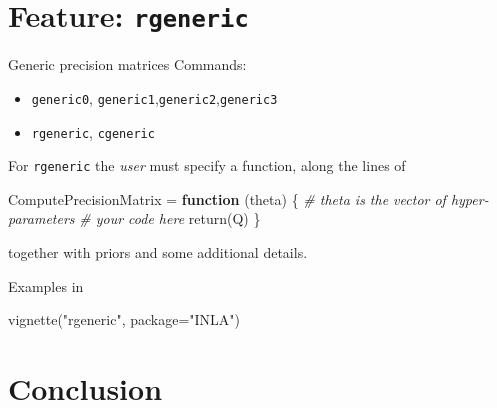 \documentclass[
  ignorenonframetext,
]{beamer}
\newenvironment{Shaded}{\begin{snugshade}}{\end{snugshade}}
\newcommand{\AttributeTok}[1]{\textcolor[rgb]{0.77,0.63,0.00}{#1}}
\newcommand{\CommentTok}[1]{\textcolor[rgb]{0.56,0.35,0.01}{\textit{#1}}}
\newcommand{\ControlFlowTok}[1]{\textcolor[rgb]{0.13,0.29,0.53}{\textbf{#1}}}
\newcommand{\FunctionTok}[1]{\textcolor[rgb]{0.00,0.00,0.00}{#1}}
\newcommand{\NormalTok}[1]{#1}
\newcommand{\OtherTok}[1]{\textcolor[rgb]{0.56,0.35,0.01}{#1}}
\newcommand{\StringTok}[1]{\textcolor[rgb]{0.31,0.60,0.02}{#1}}
\begin{document}
\hypertarget{feature-rgeneric}{%
\section{\texorpdfstring{Feature:
\texttt{rgeneric}}{Feature: rgeneric}}\label{feature-rgeneric}}

\begin{frame}[fragile]{Generic precision matrices}
\protect\hypertarget{generic-precision-matrices}{}
Commands:

\begin{itemize}
\item
  \texttt{generic0},
  \texttt{generic1},\texttt{generic2},\texttt{generic3}
\item
  \texttt{rgeneric}, \texttt{cgeneric}
\end{itemize}

For \texttt{rgeneric} the \emph{user} must specify a function, along the
lines of

\begin{Shaded}
\begin{Highlighting}[]
\NormalTok{ComputePrecisionMatrix }\OtherTok{=} \ControlFlowTok{function}\NormalTok{ (theta) \{}
  \CommentTok{\# theta is the vector of hyper{-}parameters}
  \CommentTok{\# your code here}
  \FunctionTok{return}\NormalTok{(Q)}
\NormalTok{\}}
\end{Highlighting}
\end{Shaded}

together with priors and some additional details.

Examples in

\begin{Shaded}
\begin{Highlighting}[]
\FunctionTok{vignette}\NormalTok{(}\StringTok{"rgeneric"}\NormalTok{, }\AttributeTok{package=}\StringTok{"INLA"}\NormalTok{)}
\end{Highlighting}
\end{Shaded}
\end{frame}

\hypertarget{conclusion}{%
\section{Conclusion}\label{conclusion}}
\end{document}
